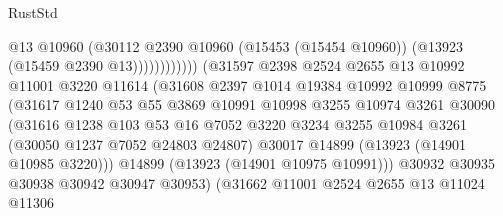 \begin{lexlean}{RustStd}
\begin{coremodule}
                                            @13
                                            @10960
                                            (@30112
                                              @2390
                                              @10960
                                              (@15453 (@15454 @10960))
                                              (@13923 (@15459 @2390 @13))))))))))))
                          (@31597
                            @2398
                            @2524
                            @2655
                            @13
                            @10992
                            @11001
                            @3220
                            @11614
                            (@31608
                              @2397
                              @1014
                              @19384
                              @10992
                              @10999
                              @8775
                              (@31617
                                @1240
                                @53
                                @55
                                @3869
                                @10991
                                @10998
                                @3255
                                @10974
                                @3261
                                @30090
                                (@31616
                                  @1238
                                  @103
                                  @53
                                  @16
                                  @7052
                                  @3220
                                  @3234
                                  @3255
                                  @10984
                                  @3261
                                  (@30050 @1237 @7052 @24803 @24807)
                                  @30017
                                  @14899
                                  (@13923 (@14901 @10985 @3220)))
                                @14899
                                (@13923 (@14901 @10975 @10991)))
                              @30932
                              @30935
                              @30938
                              @30942
                              @30947
                              @30953)
                            (@31662
                              @11001
                              @2524
                              @2655
                              @13
                              @11024
                              @11306

\end{coremodule}
\end{lexlean}
